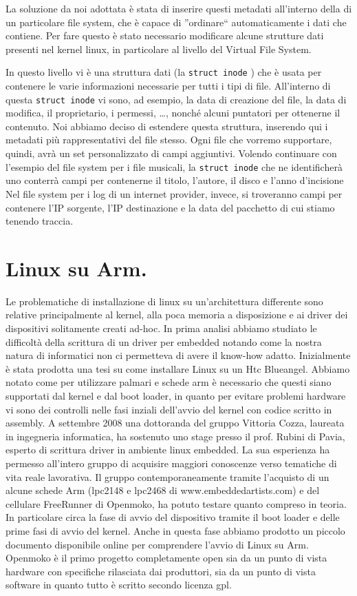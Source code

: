 \documentclass[a4paper,12pt]{article}
\newcommand{\ua }{\`{u} }
\renewcommand{\aa }{\`{a} }
\newcommand{\ea }{\`{e} }
\newcommand{\egrave }{\'{e} }
\newcommand{\strucinode }{\texttt{struct inode} }
\begin{document}
La soluzione da noi adottata \ea stata di inserire questi metadati all'interno della di un particolare file system, che è capace di ''ordinare`` automaticamente i dati che contiene.
Per fare questo \ea stato necessario modificare alcune strutture dati presenti nel kernel linux, in particolare al livello del Virtual File System.

In questo livello vi \ea una struttura dati (la \strucinode) che \ea usata per contenere le varie informazioni necessarie per tutti i tipi di file.
All'interno di questa \strucinode vi sono, ad esempio, la data di creazione del file, la data di modifica, il proprietario, i permessi, \dots, nonch\egrave alcuni puntatori per ottenerne il contenuto.
Noi abbiamo deciso di estendere questa struttura, inserendo qui i metadati pi\ua rappresentativi del file stesso.
Ogni file che vorremo supportare, quindi, avr\aa un set personalizzato di campi aggiuntivi.
Volendo continuare con l'esempio del file system per i file musicali, la \strucinode che ne identificher\aa uno conterr\aa campi per contenerne il titolo, l'autore, il disco e l'anno d'incisione
Nel file system per i log di un internet provider, invece, si troveranno campi per contenere l'IP sorgente, l'IP destinazione e la data del pacchetto di cui stiamo tenendo traccia.

\section*{Linux su Arm.}
Le problematiche di installazione di linux su un'architettura differente sono relative principalmente al kernel, alla poca memoria a disposizione e ai driver dei dispositivi solitamente creati ad-hoc. In prima analisi abbiamo studiato le difficolt\aa della scrittura di un driver per embedded notando come la nostra natura di informatici non ci permetteva di avere il know-how adatto.
Inizialmente \ea stata prodotta una tesi su come installare Linux su un Htc Blueangel. Abbiamo notato come per utilizzare palmari e schede arm \ea necessario che questi siano supportati dal kernel e dal boot loader, in quanto per evitare problemi hardware vi sono dei controlli nelle fasi inziali dell'avvio del kernel con codice scritto in assembly.
A settembre 2008 una dottoranda del gruppo Vittoria Cozza, laureata in ingegneria informatica, ha sostenuto uno stage presso il prof. Rubini di Pavia, esperto di scrittura driver in ambiente linux embedded. La sua esperienza ha permesso all'intero gruppo di acquisire maggiori conoscenze verso tematiche di vita reale lavorativa. Il gruppo contemporaneamente tramite l'acquisto di un alcune schede Arm (lpc2148 e lpc2468 di  www.embeddedartists.com) e del cellulare FreeRunner di Openmoko, ha potuto testare quanto compreso in teoria. In particolare circa la fase di avvio del dispositivo tramite il boot loader e delle prime fasi di avvio del kernel. Anche in questa fase abbiamo prodotto un piccolo documento disponibile online per comprendere l'avvio di Linux su Arm.
Openmoko \ea il primo progetto completamente open sia da un punto di vista hardware con specifiche rilasciata dai produttori, sia da un punto di vista software in quanto tutto \ea scritto secondo licenza gpl.
\end{document}
